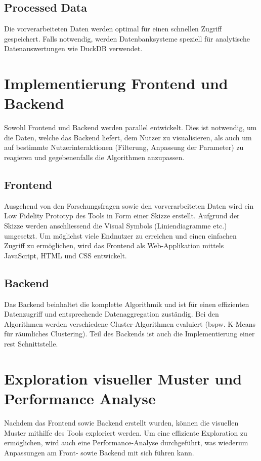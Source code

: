 \subsection{Processed Data}
Die vorverarbeiteten Daten werden optimal für einen schnellen Zugriff gespeichert. Falls notwendig, werden  Datenbanksysteme speziell für analytische Datenauswertungen wie DuckDB verwendet.

\section{Implementierung Frontend und Backend}
Sowohl Frontend und Backend werden parallel entwickelt. Dies ist notwendig, um die Daten, welche das Backend liefert, dem Nutzer zu visualisieren, als auch um auf bestimmte Nutzerinteraktionen (Filterung, Anpassung der Parameter) zu reagieren und gegebenenfalls die Algorithmen anzupassen.

\subsection{Frontend}
Ausgehend von den Forschungsfragen sowie den vorverarbeiteten Daten wird ein Low Fidelity Prototyp des Tools in Form einer Skizze erstellt. Aufgrund der Skizze werden anschliessend die Visual Symbols (Liniendiagramme etc.) umgesetzt. Um möglichst viele Endnutzer zu erreichen und einen einfachen Zugriff zu ermöglichen, wird das Frontend als Web-Applikation mittels JavaScript, HTML und CSS entwickelt.

\subsection{Backend}
Das Backend beinhaltet die komplette Algorithmik und ist für einen effizienten Datenzugriff und entsprechende Datenaggregation zuständig. Bei den Algorithmen werden verschiedene Cluster-Algorithmen evaluiert (bspw. K-Means für räumliches Clustering). Teil des Backends ist auch die Implementierung einer \acrshort{rest} Schnittstelle.

\section{Exploration visueller Muster und Performance Analyse}
Nachdem das Frontend sowie Backend erstellt wurden, können die visuellen Muster mithilfe des Tools exploriert werden. Um eine effiziente Exploration zu ermöglichen, wird auch eine Performance-Analyse durchgeführt, was wiederum Anpassungen am Front- sowie Backend mit sich führen kann.
